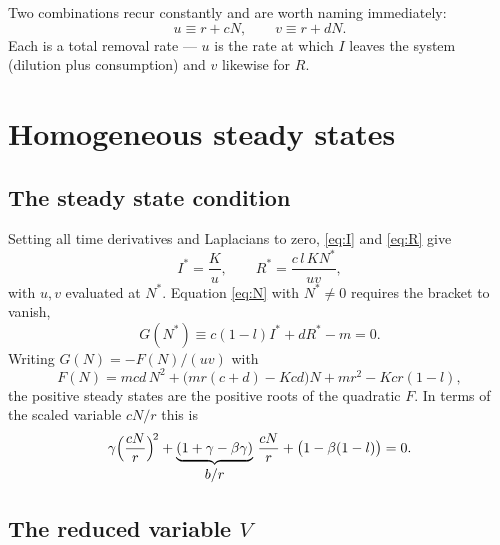 \documentclass[11pt,a4paper]{article}
\newcommand{\Ns}{N^{*}}
\newcommand{\Is}{I^{*}}
\newcommand{\Rs}{R^{*}}
\theoremstyle{plain}
\theoremstyle{remark}
\begin{document}
Two combinations recur constantly and are worth naming immediately:
\begin{equation}
u \equiv r + cN, \qquad v \equiv r + dN.
\label{eq:uv}
\end{equation}
Each is a total removal rate --- $u$ is the rate at which $I$ leaves the system
(dilution plus consumption) and $v$ likewise for $R$.

\section{Homogeneous steady states}

\subsection{The steady state condition}

Setting all time derivatives and Laplacians to zero, \eqref{eq:I} and
\eqref{eq:R} give
\begin{equation}
\Is = \frac{K}{u},\qquad
\Rs = \frac{c\,l\,K\Ns}{uv},
\label{eq:IRstar}
\end{equation}
with $u,v$ evaluated at $\Ns$. Equation \eqref{eq:N} with $\Ns\ne 0$ requires
the bracket to vanish,
\begin{equation}
G(\Ns) \equiv c(1-l)\Is + d\Rs - m = 0.
\label{eq:fixedpoint}
\end{equation}
Writing $G(N) = -F(N)/(uv)$ with
\begin{equation}
F(N) = mcd\,N^2 + \bigl(mr(c+d) - Kcd\bigr)N + mr^2 - Kcr(1-l),
\label{eq:Fquad}
\end{equation}
the positive steady states are the positive roots of the quadratic $F$. In terms
of the scaled variable $cN/r$ this is
\begin{equation}
\gamma\Bigl(\frac{cN}{r}\Bigr)^{\!2}
+ \underbrace{(1+\gamma-\beta\gamma)}_{\textstyle b/r}\,\frac{cN}{r}
+ \bigl(1-\beta(1-l)\bigr) = 0 .
\label{eq:quadscaled}
\end{equation}

\subsection{The reduced variable \texorpdfstring{$V$}{V}}
\end{document}
